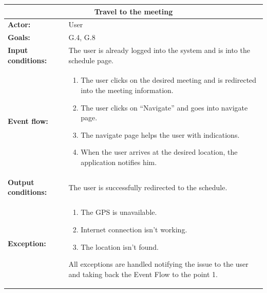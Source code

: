 \begin{tabular} { p{5cm} p{8cm} }  
\multicolumn{2}{c}{\textbf{Travel to the meeting}}\\
\hline
\textbf{Actor:} & User \\ 
\textbf{Goals:} & G.4, G.8 \\ 
\textbf{Input conditions:} & The user is already logged into the system and is into the schedule page. \\
\textbf{Event flow:} & \begin{enumerate}
				\item
				The user clicks on the desired meeting and is redirected into the meeting information.
				\item
				The user clicks on “Navigate” and goes into navigate page.
				\item
				The navigate page helps the user with indications.
				\item
				When the user arrives at the desired location, the application notifies him.
			\end{enumerate} \\ 
\textbf{Output conditions:} & The user is successfully redirected to the
schedule.\\ 
\textbf{Exception:} & \begin{enumerate}
				\item
				The GPS is unavailable.
				\item
				Internet connection isn't working.				
				\item
				The location isn’t found. 
			\end{enumerate}
All exceptions are handled notifying the issue to the user and taking back the Event Flow to the point 1. \\
\hline
\end{tabular}

